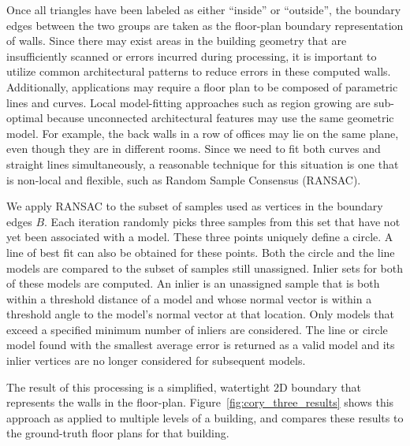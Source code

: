 \documentclass[journal]{IEEEtran}
\begin{document}
Once all triangles have been labeled as either ``inside'' or ``outside'', the boundary edges between the two groups are taken as the floor-plan boundary representation of walls.  Since there may exist areas in the building geometry that are insufficiently scanned or errors incurred during processing, it is important to utilize common architectural patterns to reduce errors in these computed walls.  Additionally, applications may require a floor plan to be composed of parametric lines and curves.  Local model-fitting approaches such as region growing are sub-optimal because unconnected architectural features may use the same geometric model.  For example, the back walls in a row of offices may lie on the same plane, even though they are in different rooms. Since we need to fit both curves and straight lines simultaneously, a reasonable technique for this situation is one that is non-local and flexible, such as Random Sample Consensus (RANSAC).

We apply RANSAC to the subset of samples used as vertices in the boundary edges $B$.  Each iteration randomly picks three samples from this set that have not yet been associated with a model.  These three points uniquely define a circle.  A line of best fit can also be obtained for these points.  Both the circle and the line models are compared to the subset of samples still unassigned.  Inlier sets for both of these models are computed.  An inlier is an unassigned sample that is both within a threshold distance of a model and whose normal vector is within a threshold angle to the model's normal vector at that location.  Only models that exceed a specified minimum number of inliers are considered.  The line or circle model found with the smallest average error is returned as a valid model and its inlier vertices are no longer considered for subsequent models.

The result of this processing is a simplified, watertight 2D boundary that represents the walls in the floor-plan.  Figure~\ref{fig:cory_three_results} shows this approach as applied to multiple levels of a building, and compares these results to the ground-truth floor plans for that building.
\end{document}
